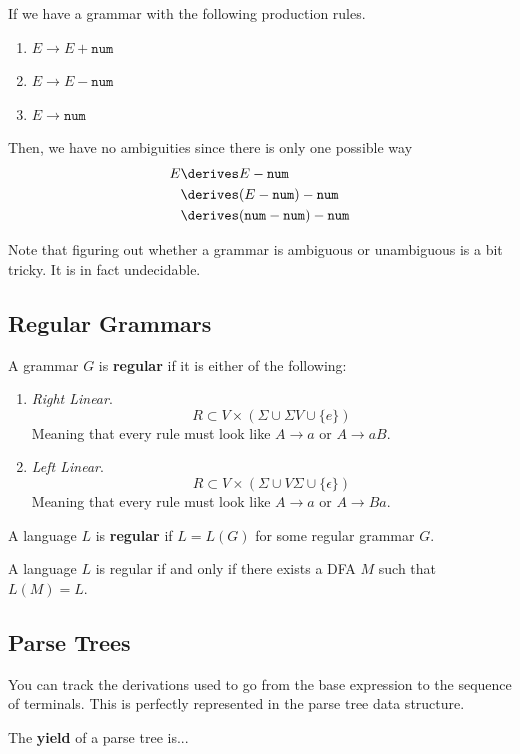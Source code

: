   \begin{example}
    If we have a grammar with the following production rules. 
    \begin{enumerate}
      \item $E \to E + \texttt{num}$
      \item $E \to E - \texttt{num}$ 
      \item $E \to \texttt{num}$
    \end{enumerate}
    Then, we have no ambiguities since there is only one possible way 
    \begin{align}
      E & \derives E - \texttt{num} \\ 
        & \derives (E - \texttt{num}) - \texttt{num} \\
        & \derives (\texttt{num} - \texttt{num}) - \texttt{num} 
    \end{align}
  \end{example}

  Note that figuring out whether a grammar is ambiguous or unambiguous is a bit tricky. It is in fact undecidable. 

\subsection{Regular Grammars}

  \begin{definition}[Regular]
    A grammar $G$ is \textbf{regular} if it is either of the following: 
    \begin{enumerate}
      \item \textit{Right Linear}. 
        \begin{equation}
          R \subset V \times (\Sigma \cup \Sigma V \cup \{e\}) 
        \end{equation}
        Meaning that every rule must look like $A \to a$ or $A \to a B$. 

      \item \textit{Left Linear}. 
        \begin{equation}
          R \subset V \times (\Sigma \cup V \Sigma \cup \{\epsilon\}) 
        \end{equation}
        Meaning that every rule must look like $A \to a$ or $A \to Ba$. 
    \end{enumerate}
    A language $L$ is \textbf{regular} if $L = L(G)$ for some regular grammar $G$. 
  \end{definition}

  \begin{theorem}
    A language $L$ is regular if and only if there exists a DFA $M$ such that $L(M) = L$. 
  \end{theorem}

\subsection{Parse Trees}

  You can track the derivations used to go from the base expression to the sequence of terminals. This is perfectly represented in the parse tree data structure. 

  \begin{definition}
    The \textbf{yield} of a parse tree is...
  \end{definition}

